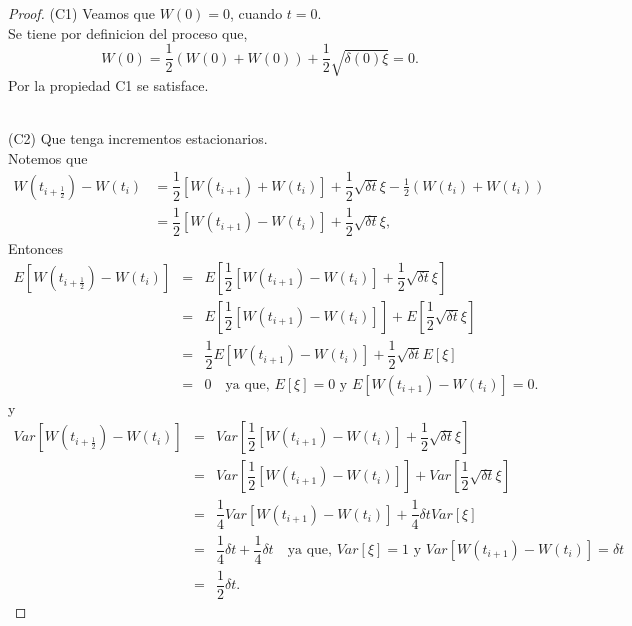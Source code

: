 \documentclass[
  letterpaper,
  DIV=11,
  numbers=noendperiod]{scrreprt}
\theoremstyle{definition}
\theoremstyle{plain}
\theoremstyle{remark}
\begin{document}
\begin{proof}

(C1) Veamos que \(W\left(0\right)=0\), cuando \(t=0\).\\
Se tiene por definicion del proceso que, \[
W\left(0\right)=\frac{1}{2}(W(0)+W(0))+\frac{1}{2}\sqrt{\delta(0)\xi}=0.
\] Por la propiedad C1 se satisface.\\
\strut \\
(C2) Que tenga incrementos estacionarios.\\
Notemos que \[
\begin{align*}
W(t_{i+\frac{1}{2}})-W(t_{i}) & = \dfrac{1}{2}\left[W\left(t_{i+1}\right)+W\left(t_{i}\right)\right]+\dfrac{1}{2}\sqrt{\delta t}\xi-\frac{1}{2}(W(t_{i})+W(t_{i}))\\
& = \dfrac{1}{2}\left[W\left(t_{i+1}\right)-W\left(t_{i}\right)\right]+\dfrac{1}{2}\sqrt{\delta t}\xi,
\end{align*}
\] Entonces \[
\begin{eqnarray*}
E\left[W(t_{i+\frac{1}{2}})-W(t_{i})\right] & = & E\left[\dfrac{1}{2}\left[W\left(t_{i+1}\right)-W\left(t_{i}\right)\right]+\dfrac{1}{2}\sqrt{\delta t}\xi\right]\\
& = & E\left[\dfrac{1}{2}\left[W\left(t_{i+1}\right)-W\left(t_{i}\right)\right]\right]+E\left[\dfrac{1}{2}\sqrt{\delta t}\xi\right]\\
& = & \dfrac{1}{2}E\left[W\left(t_{i+1}\right)-W\left(t_{i}\right)\right]+\dfrac{1}{2}\sqrt{\delta t}E\left[\xi\right]\\
& = & 0\quad\text{ya que, }E\left[\xi\right]=0\text{ y }E\left[W\left(t_{i+1}\right)-W\left(t_{i}\right)\right]=0.
\end{eqnarray*}
\] y \[
\begin{eqnarray}
Var\left[W(t_{i+\frac{1}{2}})-W(t_{i})\right]& = & Var\left[\dfrac{1}{2}\left[W\left(t_{i+1}\right)-W\left(t_{i}\right)\right]+\dfrac{1}{2}\sqrt{\delta t}\xi\right]\\
& = & Var\left[\dfrac{1}{2}\left[W\left(t_{i+1}\right)-W\left(t_{i}\right)\right]\right]+Var\left[\dfrac{1}{2}\sqrt{\delta t}\xi\right]\\
& = & \dfrac{1}{4}Var\left[W\left(t_{i+1}\right)-W\left(t_{i}\right)\right]+\dfrac{1}{4}\delta t Var\left[\xi\right]\\
& = & \dfrac{1}{4}\delta t+\dfrac{1}{4}\delta t\quad\text{ya que, }Var\left[\xi\right]=1\text{ y }Var\left[W\left(t_{i+1}\right)-W\left(t_{i}\right)\right]=\delta t\\
& = & \dfrac{1}{2}\delta t.
\end{eqnarray}
\]


\end{proof}
\end{document}
